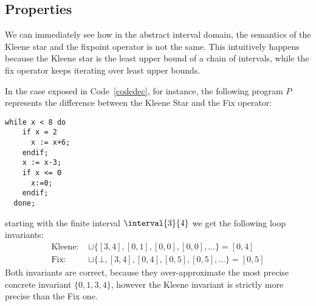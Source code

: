 \subsection{Properties}\label{sub:intervalsprop}

We can immediately see how in the abstract interval domain, the
semantics of the Kleene star and the fixpoint operator is not the
same. This intuitively happens because the Kleene star is the least
upper bound of a chain of intervals, while the fix operator keeps
iterating over least upper bounds.

\begin{example}\label{ex:fix} In the case exposed in
  Code~\ref{codedec}, for instance, the following program \(P\)
  represents the difference between the Kleene Star and the Fix
  operator:
  \begin{lstlisting}[caption=Program P\, denoting \(\fix{\com}\) and \(\com^*\) difference, label=codedec, language=Imp]
  while x < 8 do
    if x = 2
      x := x+6;
    endif;
    x := x-3;
    if x <= 0
      x:=0;
    endif;
  done;\end{lstlisting}
  starting with the finite interval \(\interval{3}{4}\) we get the
  following loop invariants:
  \begin{align*}
    \text{Kleene: } &\sqcup\{[3,4], [0,1], [0,0], [0,0], \ldots\} = [0,4]\\
    \text{Fix: } & \sqcup\{\bot, [3,4], [0,4], [0,5], [0,5],\ldots\} = [0,5]
  \end{align*}
  \noindent
  Both invariants are correct, because they over-approximate the most
  precise concrete invariant \(\{0,1,3,4\}\), however the Kleene
  invariant is strictly more precise than the Fix one.
\end{example}


